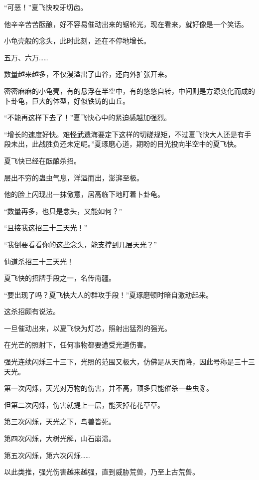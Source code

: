 
\begin{this_body}

“可恶！”夏飞快咬牙切齿。

他辛辛苦苦酝酿，好不容易催动出来的锯轮光，现在看来，就好像是一个笑话。

小龟壳般的念头，此时此刻，还在不停地增长。

五万、六万……

数量越来越多，不仅漫溢出了山谷，还向外扩张开来。

密密麻麻的小龟壳，有的悬浮在半空中，有的悠悠自转，中间则是方源变化而成的卜卦龟，巨大的体型，好似铁铸的山丘。

“不能再这样下去了！”夏飞快心中的紧迫感越加强烈。

“增长的速度好快。难怪武遗海要定下这样的切磋规矩，不过夏飞快大人还是有手段未出，此战胜负还未定呢。”夏琢磨心道，期盼的目光投向半空中的夏飞快。

夏飞快已经在酝酿杀招。

层出不穷的蛊虫气息，洋溢而出，澎湃至极。

他的脸上闪现出一抹傲意，居高临下地盯着卜卦龟。

“数量再多，也只是念头，又能如何？”

“且接我这招三十三天光！”

“我倒要看看你的这些念头，能支撑到几层天光？”

仙道杀招三十三天光！

夏飞快的招牌手段之一，名传南疆。

“要出现了吗？夏飞快大人的群攻手段！”夏琢磨顿时暗自激动起来。

这杀招颇有说法。

一旦催动出来，以夏飞快为灯芯，照射出猛烈的强光。

在光芒的照射下，任何事物都要遭受光道伤害。

强光连续闪烁三十三下，光照的范围又极大，仿佛是从天而降，因此号称是三十三天光。

第一次闪烁，天光对万物的伤害，并不高，顶多只能催杀一些虫豸。

但第二次闪烁，伤害就提上一层，能灭掉花花草草。

第三次闪烁，天光之下，鸟兽皆死。

第四次闪烁，大树光解，山石崩溃。

第五次闪烁，第六次闪烁……

以此类推，强光伤害越来越强，直到威胁荒兽，乃至上古荒兽。


\end{this_body}
